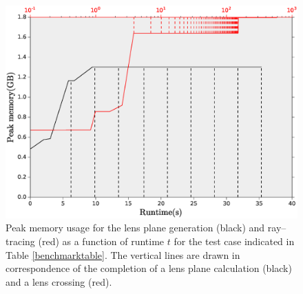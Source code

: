 \documentclass[reprint,aps,prd,superscriptaddress,showkeys,showpacs]{revtex4-1}
\begin{document}
\begin{figure}
\includegraphics[scale=0.3]{Figures/memory_usage.eps}
\caption{Peak memory usage for the lens plane generation (black) and ray--tracing (red) as a function of runtime $t$ for the test case indicated in Table \ref{benchmarktable}. The vertical lines are drawn in correspondence of the completion of a lens plane calculation (black) and a lens crossing (red).}
\label{memoryfig}
\end{figure}

\end{document}
